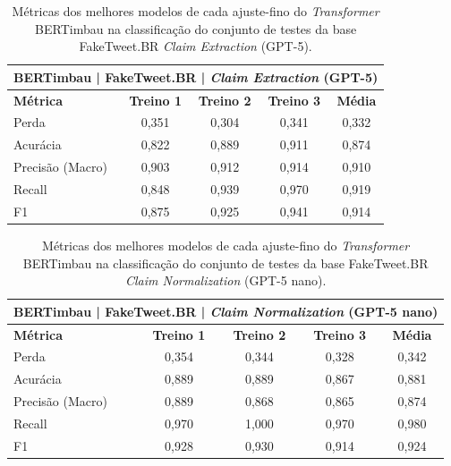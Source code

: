 \begin{table}[!htbp]
\centering
\begin{tabular}{l*4c}
\toprule
\multicolumn{5}{c}{\textbf{BERTimbau | FakeTweet.BR | \textit{Claim Extraction} (GPT-5)}} \\ 
\midrule
\textbf{Métrica} & \textbf{Treino 1} & \textbf{Treino 2} & \textbf{Treino 3} & \textbf{Média} \\ 
\midrule
Perda & 0,351 & 0,304 & 0,341 & 0,332 \\ 
Acurácia & 0,822 & 0,889 & 0,911 & 0,874 \\ 
Precisão (Macro) & 0,903 & 0,912 & 0,914 & 0,910 \\ 
Recall & 0,848 & 0,939 & 0,970 & 0,919 \\ 
F1 & 0,875 & 0,925 & 0,941 & 0,914 \\ 
\bottomrule
\end{tabular}
\caption{Métricas dos melhores modelos de cada ajuste-fino do \textit{Transformer} BERTimbau na classificação do conjunto de testes da base FakeTweet.BR \textit{Claim Extraction} (GPT-5).}
\end{table}

\begin{table}[!htbp]
\centering
\begin{tabular}{l*4c}
\toprule
\multicolumn{5}{c}{\textbf{BERTimbau | FakeTweet.BR | \textit{Claim Normalization} (GPT-5 nano)}} \\ 
\midrule
\textbf{Métrica} & \textbf{Treino 1} & \textbf{Treino 2} & \textbf{Treino 3} & \textbf{Média} \\ 
\midrule
Perda & 0,354 & 0,344 & 0,328 & 0,342 \\ 
Acurácia & 0,889 & 0,889 & 0,867 & 0,881 \\ 
Precisão (Macro) & 0,889 & 0,868 & 0,865 & 0,874 \\ 
Recall & 0,970 & 1,000 & 0,970 & 0,980 \\ 
F1 & 0,928 & 0,930 & 0,914 & 0,924 \\ 
\bottomrule
\end{tabular}
\caption{Métricas dos melhores modelos de cada ajuste-fino do \textit{Transformer} BERTimbau na classificação do conjunto de testes da base FakeTweet.BR \textit{Claim Normalization} (GPT-5 nano).}
\end{table}

